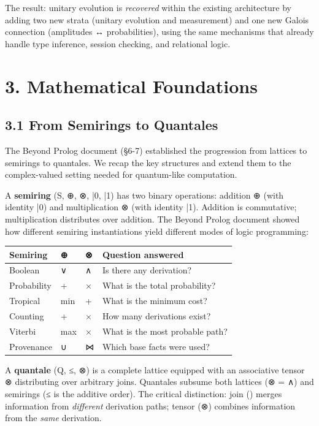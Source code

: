 \documentclass[11pt]{article}
\begin{document}
The result: unitary evolution is \emph{recovered} within the existing architecture by
adding two new strata (unitary evolution and measurement) and one new Galois
connection (amplitudes ↔ probabilities), using the same mechanisms that already
handle type inference, session checking, and relational logic.
\section{3. Mathematical Foundations}
\label{sec:orga4b0a64}

\subsection{3.1 From Semirings to Quantales}
\label{sec:org4cdcd97}

The Beyond Prolog document (§6-7) established the progression from lattices to
semirings to quantales. We recap the key structures and extend them to the
complex-valued setting needed for quantum-like computation.

A \textbf{semiring} (S, ⊕, ⊗, \bar{0}, \bar{1}) has two binary operations:
addition ⊕ (with identity \bar{0}) and multiplication ⊗ (with identity \bar{1}).
Addition is commutative; multiplication distributes over addition. The Beyond
Prolog document showed how different semiring instantiations yield different modes
of logic programming:

\begin{center}
\begin{tabular}{llll}
Semiring & ⊕ & ⊗ & Question answered\\
\hline
Boolean & ∨ & ∧ & Is there any derivation?\\
Probability & + & × & What is the total probability?\\
Tropical & min & + & What is the minimum cost?\\
Counting & + & × & How many derivations exist?\\
Viterbi & max & × & What is the most probable path?\\
Provenance & ∪ & ⋈ & Which base facts were used?\\
\end{tabular}
\end{center}

A \textbf{quantale} (Q, ≤, ⊗) is a complete lattice equipped with an associative tensor
⊗ distributing over arbitrary joins. Quantales subsume both lattices (⊗ = ∧) and
semirings (≤ is the additive order). The critical distinction: join (\bigvee) merges
information from \emph{different} derivation paths; tensor (⊗) combines information
from the \emph{same} derivation.
\end{document}
